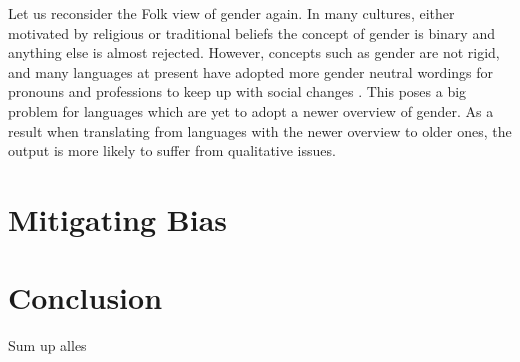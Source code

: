 \documentclass{article}
\begin{document}
\noindent
Let us reconsider the Folk view of gender again. In many cultures, either motivated by religious or traditional beliefs the concept of gender is binary and anything else is almost rejected. However, concepts such as gender are not rigid, and many languages at present have adopted more gender neutral wordings for pronouns and professions to keep up with social changes \cite{misersky2019grammatical}. This poses a big problem for languages which are yet to adopt a newer overview of gender. As a result when translating from languages with the newer overview to older ones, the output is more likely to suffer from qualitative issues. 


\section*{Mitigating Bias}




\section*{Conclusion}
Sum up alles

\clearpage


\end{document}
